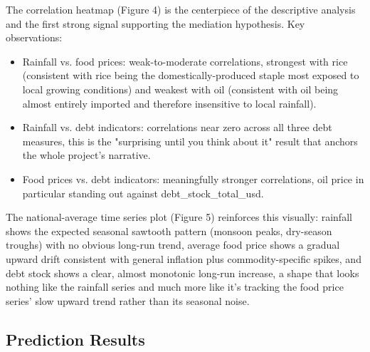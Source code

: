 \documentclass[12pt,a4paper]{article}
\begin{document}
The correlation heatmap (Figure 4) is the centerpiece of the descriptive analysis and the first strong signal supporting the mediation hypothesis. Key observations:
\begin{itemize}[leftmargin=2em]
  \item Rainfall vs. food prices: weak-to-moderate correlations, strongest with rice (consistent with rice being the domestically-produced staple most exposed to local growing conditions) and weakest with oil (consistent with oil being almost entirely imported and therefore insensitive to local rainfall).
  \item Rainfall vs. debt indicators: correlations near zero across all three debt measures, this is the "surprising until you think about it" result that anchors the whole project's narrative.
  \item Food prices vs. debt indicators: meaningfully stronger correlations, oil price in particular standing out against debt_stock_total_usd.
\end{itemize}

The national-average time series plot (Figure 5) reinforces this visually: rainfall shows the expected seasonal sawtooth pattern (monsoon peaks, dry-season troughs) with no obvious long-run trend, average food price shows a gradual upward drift consistent with general inflation plus commodity-specific spikes, and debt stock shows a clear, almost monotonic long-run increase, a shape that looks nothing like the rainfall series and much more like it's tracking the food price series' slow upward trend rather than its seasonal noise.


\subsection{Prediction Results}
\end{document}
